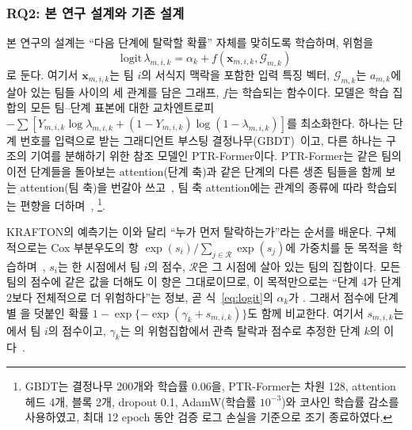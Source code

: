 \subsubsection{RQ2: 본 연구 설계와 기존 설계}
\label{sec:method:rq2}
본 연구의 설계는  “다음 단계에 탈락할 확률” 자체를 맞히도록 학습하며, 위험을
\begin{equation}
\mathrm{logit}\,\lambda_{m,i,k}=\alpha_k+f(\mathbf{x}_{m,i,k},\mathcal{G}_{m,k})
\label{eq:logit}
\end{equation}
로 둔다. 여기서 $\mathbf{x}_{m,i,k}$는 팀 $i$의 서식지 맥락을 포함한 입력 특징 벡터, $\mathcal{G}_{m,k}$는 $a_{m,k}$에 살아 있는 팀들 사이의 세 관계를 담은 그래프, $f$는 학습되는 함수이다.
모델은 학습 집합의 모든 팀--단계 표본에 대한 교차엔트로피 $-\sum[Y_{m,i,k}\log\lambda_{m,i,k}+(1-Y_{m,i,k})\log(1-\lambda_{m,i,k})]$를 최소화한다.
하나는 단계 번호를 입력으로 받는 그래디언트 부스팅 결정나무(GBDT)~\cite{Friedman01}이고, 다른 하나는 구조의 기여를 분해하기 위한 참조 모델인 PTR-Former이다.
PTR-Former는 같은 팀의 이전 단계들을 돌아보는 attention(단계 축)과 같은 단계의 다른 생존 팀들을 함께 보는 attention(팀 축)을 번갈아 쓰고~\cite{Vaswani17}, 팀 축 attention에는 관계의 종류에 따라 학습되는 편향을 더하며~\cite{Ying21}, \footnote{GBDT는 결정나무 200개와 학습률 0.06을, PTR-Former는 차원 128, attention 헤드 4개, 블록 2개, dropout 0.1, AdamW(학습률 $10^{-3}$)와 코사인 학습률 감소를 사용하였고, 최대 12 epoch 동안 검증 로그 손실을 기준으로 조기 종료하였다. }.

KRAFTON의 예측기는 이와 달리 “누가 먼저 탈락하는가”라는 순서를 배운다.
구체적으로는 Cox 부분우도의 항 $\exp(s_i)/\sum_{j\in\mathcal{R}}\exp(s_j)$에 가중치를 둔 목적을 학습하며~\cite{Cox72}, $s_i$는 한 시점에서 팀 $i$의 점수, $\mathcal{R}$은 그 시점에 살아 있는 팀의 집합이다.
모든 팀의 점수에 같은 값을 더해도 이 항은 그대로이므로, 이 목적만으로는 “단계 4가 단계 2보다 전체적으로 더 위험하다”는 정보, 곧 식~\eqref{eq:logit}의 $\alpha_k$가 .
그래서 점수에 단계별 을 덧붙인 확률 $1-\exp\{-\exp(\gamma_k+s_{m,i,k})\}$도 함께 비교한다. 여기서 $s_{m,i,k}$는 에서 팀 $i$의 점수이고, $\gamma_k$는 의 위험집합에서 관측 탈락과 점수로 추정한 단계 $k$의 이다~\cite{PrenticeGloeckler78}.

